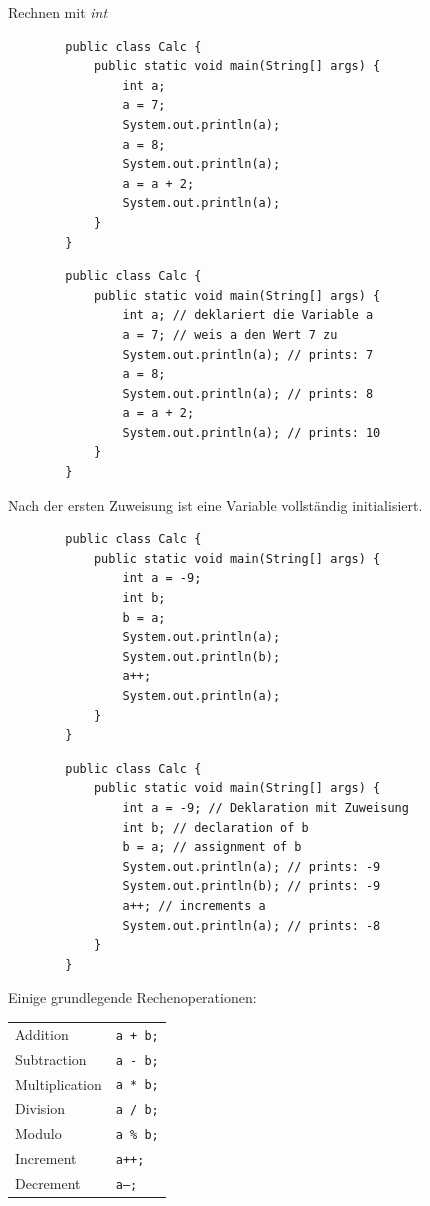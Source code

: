 \begin{frame}{Rechnen mit \emph{int}}
	\begin{lstlisting}
		public class Calc {
			public static void main(String[] args) {
				int a;
				a = 7;
				System.out.println(a);
				a = 8;
				System.out.println(a);
				a = a + 2;
				System.out.println(a);
			}
		}
	\end{lstlisting}
	
	\framebreak
	\begin{lstlisting}
		public class Calc {
			public static void main(String[] args) {
				int a; // deklariert die Variable a
				a = 7; // weis a den Wert 7 zu
				System.out.println(a); // prints: 7
				a = 8;
				System.out.println(a); // prints: 8
				a = a + 2;
				System.out.println(a); // prints: 10
			}
		}
	\end{lstlisting}
	Nach der ersten Zuweisung ist eine Variable vollständig initialisiert.
	\framebreak
	\begin{lstlisting}
		public class Calc {
			public static void main(String[] args) {
				int a = -9;
				int b;
				b = a;
				System.out.println(a);
				System.out.println(b); 
				a++;
				System.out.println(a); 
			}
		}
	\end{lstlisting}
	\framebreak
	\begin{lstlisting}
		public class Calc {
			public static void main(String[] args) {
				int a = -9; // Deklaration mit Zuweisung
				int b; // declaration of b
				b = a; // assignment of b
				System.out.println(a); // prints: -9
				System.out.println(b); // prints: -9
				a++; // increments a
				System.out.println(a); // prints: -8
			}
		}
	\end{lstlisting}
	
	\framebreak
	Einige grundlegende Rechenoperationen:
	\begin{tabular}{ll}
		Addition & \texttt{a + b;} \\
		Subtraction & \texttt{a - b;} \\
		Multiplication &\texttt{a * b;} \\
		Division & \texttt{a / b;} \\
		Modulo & \texttt{a \% b;} \\
		Increment & \texttt{a++;} \\
		Decrement & \texttt{a--;} \\
	\end{tabular}
\end{frame}

